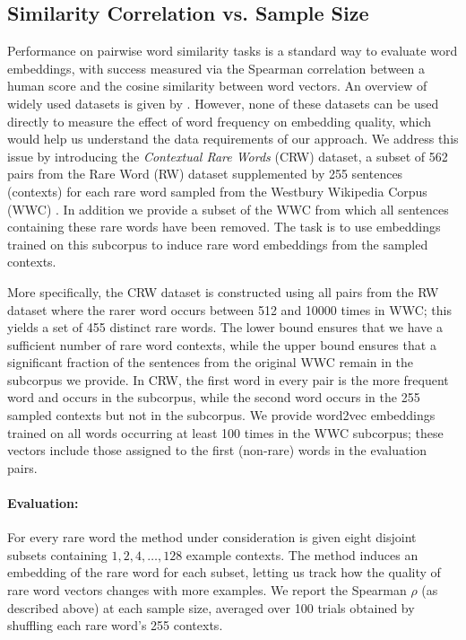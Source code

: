 \documentclass[11pt,a4paper]{article}
\begin{document}
\subsection{Similarity Correlation vs. Sample Size}\label{subsec:wordsim}

Performance on pairwise word similarity tasks is a standard way to evaluate word embeddings, with success measured via the Spearman correlation between a human score and the cosine similarity between word vectors.
An overview of widely used datasets is given by \citet{Faruqui:14}.
However, none of these datasets can be used directly to measure the effect of word frequency on embedding quality, which would help us understand the data requirements of our approach.
We address this issue by introducing the {\em Contextual Rare Words} (CRW) dataset, a subset of 562 pairs from the Rare Word (RW) dataset \cite{Luong:13} supplemented by 255 sentences (contexts) for each rare word sampled from the Westbury Wikipedia Corpus (WWC) \cite{Shaoul:10}.
In addition we provide a subset of the WWC from which all sentences containing these rare words have been removed.
The task is to use embeddings trained on this subcorpus to induce rare word embeddings from the sampled contexts.

More specifically, the CRW dataset is constructed using all pairs from the RW dataset where the rarer word occurs between 512 and 10000 times in WWC; this yields a set of 455 distinct rare words.
The lower bound ensures that we have a sufficient number of rare word contexts, while the upper bound ensures that a significant fraction of the sentences from the original WWC remain in the subcorpus we provide.
In CRW, the first word in every pair is the more frequent word and occurs in the subcorpus, while the second word occurs in the 255 sampled contexts but not in the subcorpus.
We provide word2vec embeddings trained on all words occurring at least 100 times in the WWC subcorpus;
these vectors include those assigned to the first (non-rare) words in the evaluation pairs.

\paragraph{Evaluation:}
For every rare word the method under consideration is given eight disjoint subsets containing $1,2,4,\dots,128$ example contexts.
The method induces an embedding of the rare word for each subset, letting us track how the quality of rare word vectors changes with more examples.
We report the Spearman $\rho$ (as described above) at each sample size, averaged over 100 trials obtained by shuffling each rare word's 255 contexts.
\end{document}
